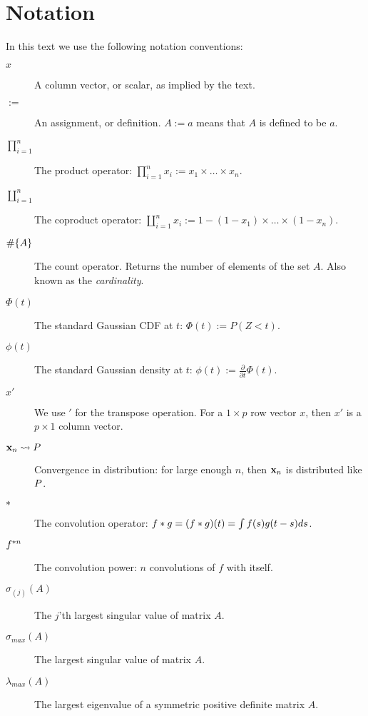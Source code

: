 


\chapter{Notation}
\label{apx:notation}

In this text we use the following notation conventions:
\begin{description}
\item[$x$] A column vector, or scalar, as implied by the text. 
\item[$:=$] An assignment, or definition. $A:=a$ means that $A$ is defined to be $a$. 
\item[$\prod_{i=1}^{n}$] The product operator: $\prod_{i=1}^{n} x_i:= x_1 \times \dots \times x_n$.
\item[$\coprod_{i=1}^{n}$] The coproduct operator: $\coprod_{i=1}^{n} x_i:= 1-(1-x_1) \times \dots \times (1-x_n)$.
\item[$\#\{ A \}$] The count operator. Returns the number of elements of the set $A$. Also known as the \emph{cardinality}.
\item[$\Phi(t)$] The standard Gaussian CDF at $t$: $\Phi(t):= P(Z<t)$.
\item[$\phi(t)$] The standard Gaussian density at $t$: $\phi(t):= \frac{\partial}{\partial t}\Phi(t)$.
\item[$x'$] We use $'$ for the transpose operation. For a $1\times p$ row vector $x$, then $x'$ is a $p \times 1$ column vector.
\item[$\mathbf{x}_n \rightsquigarrow P$] Convergence in distribution: for large enough $n$, then $\mathbf{x}_n$ is distributed like $P$.
\item[$\ast$] The convolution operator: $f \ast g=(f \ast g)(t)=\int f(s) g(t-s) ds$.
\item[$f^{\ast n}$] The convolution power: $n$ convolutions of $f$ with itself.
\item[$\sigma_{(j)}(A)$] The $j$'th largest singular value of matrix $A$. 
\item[$\sigma_{max}(A)$] The largest singular value of matrix $A$. 
\item[$\lambda_{max}(A)$] The largest eigenvalue of a symmetric positive definite matrix $A$.  
\end{description}


